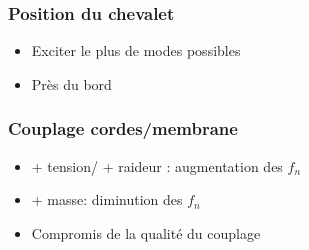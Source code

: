 \begin{frame}
  \frametitle{Position du chevalet}
  \begin{itemize}
    \item Exciter le plus de modes possibles
    \item Près du bord
  \end{itemize}
\end{frame}

\begin{frame}
  \frametitle{Couplage cordes/membrane}
  \begin{itemize}
    \item + tension/ + raideur : augmentation des $f_n$
    \item + masse: diminution des $f_n$
    \item Compromis de la qualité du couplage
  \end{itemize}
\end{frame}



